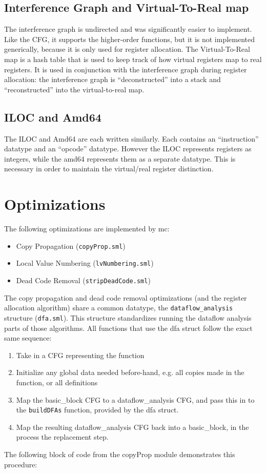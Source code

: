 \documentclass[12pt]{article}
\begin{document}
\subsection*{Interference Graph and Virtual-To-Real map}
The interference graph is undirected and was significantly easier to implement. Like the CFG, it supports the higher-order functions, but it is not implemented generically, because it is only used for register allocation. The Virtual-To-Real map is a hash table that is used to keep track of how virtual registers map to real registers. It is used in conjunction with the interference graph during register allocation: the interference graph is ``deconstructed'' into a stack and ``reconstructed'' into the virtual-to-real map.

\subsection*{ILOC and Amd64}
The ILOC and Amd64 are each written similarly. Each contains an ``instruction'' datatype and an ``opcode'' datatype. However the ILOC represents registers as integers, while the amd64 represents them as a separate datatype. This is necessary in order to maintain the virtual/real register distinction.

\section*{Optimizations}
The following optimizations are implemented by mc:

\begin{itemize}
\item Copy Propagation (\texttt{copyProp.sml})
\item Local Value Numbering (\texttt{lvNumbering.sml})
\item Dead Code Removal (\texttt{stripDeadCode.sml})
\end{itemize}

The copy propagation and dead code removal optimizations (and the register allocation algorithm) share a common datatype, the \texttt{dataflow\_analysis} structure (\texttt{dfa.sml}). This structure standardizes running the dataflow analysis parts of those algorithms. All functions that use the dfa struct follow the exact same sequence:
\begin{enumerate}
\item Take in a CFG representing the function
\item Initialize any global data needed before-hand, e.g. all copies made in the function, or all definitions
\item Map the basic\_block CFG to a dataflow\_analysis CFG, and pass this in to the \texttt{buildDFAs} function, provided by the dfa struct.
\item Map the resulting dataflow\_analysis CFG back into a basic\_block, in the process the replacement step.
\end{enumerate}
The following block of code from the copyProp module demonstrates this procedure:
\end{document}
